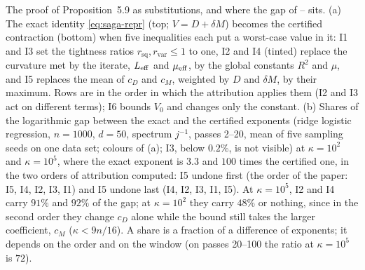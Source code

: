 \begin{explfigure}
\caption{The proof of Proposition~5.9 as substitutions, and where the gap of -- sits. (a) The exact identity \eqref{eq:saga-repr} (top; $V=D+\delta M$) becomes the certified contraction (bottom) when five inequalities each put a worst-case value in it: I1 and I3 set the tightness ratios $r_{\mathrm{sq}},r_{\mathrm{var}}\le1$ to one, I2 and I4 (tinted) replace the curvature met by the iterate, $\LEff$ and $\muEff$, by the global constants $R^2$ and $\mu$, and I5 replaces the mean of $c_D$ and $c_M$, weighted by $D$ and $\delta M$, by their maximum. Rows are in the order in which the attribution applies them (I2 and I3 act on different terms); I6 bounds $V_0$ and changes only the constant. (b) Shares of the logarithmic gap between the exact and the certified exponents (ridge logistic regression, $n=1000$, $d=50$, spectrum $j^{-1}$, passes 2--20, mean of five sampling seeds on one data set; colours of (a); I3, below $0.2\%$, is not visible) at $\kappa=10^2$ and $\kappa=10^5$, where the exact exponent is $3.3$ and $100$ times the certified one, in the two orders of attribution computed: I5 undone first (the order of the paper: I5, I4, I2, I3, I1) and I5 undone last (I4, I2, I3, I1, I5). At $\kappa=10^5$, I2 and I4 carry $91\%$ and $92\%$ of the gap; at $\kappa=10^2$ they carry $48\%$ or nothing, since in the second order they change $c_D$ alone while the bound still takes the larger coefficient, $c_M$ ($\kappa<9n/16$). A share is a fraction of a difference of exponents; it depends on the order and on the window (on passes 20--100 the ratio at $\kappa=10^5$ is $72$).}\label{fig:proofchain}
\end{explfigure}

